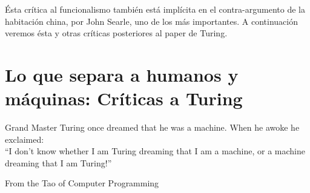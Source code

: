 \documentclass[12pt]{memoir}
\begin{document}
Ésta crítica al funcionalismo también está implícita en el contra-argumento de la habitación china, por John Searle, uno de los más importantes. A continuación veremos ésta y otras críticas posteriores al paper de Turing.

\section{Lo que separa a humanos y máquinas: Críticas a Turing}

\nocite{afterTuring}



\newpage

\printbibliography

\newpage


\epigraph{Grand Master Turing once dreamed that he was a machine. When he awoke he exclaimed: \\

“I don't know whether I am Turing dreaming that I am a machine, or a machine dreaming that I am Turing!”}{From the Tao of Computer Programming}
\end{document}
